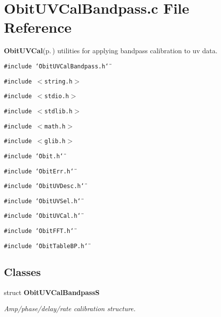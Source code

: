\section{Obit\-UVCal\-Bandpass.c File Reference}
\label{ObitUVCalBandpass_8c}
{\bf Obit\-UVCal}{\rm (p.\,\pageref{structObitUVCal})} utilities for applying bandpass calibration to uv data. 

{\tt \#include \char`\"{}Obit\-UVCal\-Bandpass.h\char`\"{}}\par
{\tt \#include $<$string.h$>$}\par
{\tt \#include $<$stdio.h$>$}\par
{\tt \#include $<$stdlib.h$>$}\par
{\tt \#include $<$math.h$>$}\par
{\tt \#include $<$glib.h$>$}\par
{\tt \#include \char`\"{}Obit.h\char`\"{}}\par
{\tt \#include \char`\"{}Obit\-Err.h\char`\"{}}\par
{\tt \#include \char`\"{}Obit\-UVDesc.h\char`\"{}}\par
{\tt \#include \char`\"{}Obit\-UVSel.h\char`\"{}}\par
{\tt \#include \char`\"{}Obit\-UVCal.h\char`\"{}}\par
{\tt \#include \char`\"{}Obit\-FFT.h\char`\"{}}\par
{\tt \#include \char`\"{}Obit\-Table\-BP.h\char`\"{}}\par
\subsection*{Classes}
\begin{CompactItemize}
\item 
struct {\bf Obit\-UVCal\-Bandpass\-S}
\begin{CompactList}\small\item\em Amp/phase/delay/rate calibration structure. \item\end{CompactList}\end{CompactItemize}
